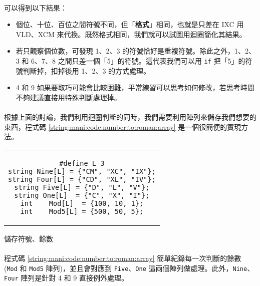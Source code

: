 \documentclass[12pt,a4paper,oneside]{report}
\begin{document}
\begin{CJK}{UTF8}{bkai}
\paragraph{}可以得到以下結果：
\begin{itemize}
\item 個位、十位、百位之間符號不同，但「{\color{blue}\textbf{格式}}」相同，也就是只差在 IXC 用 VLD、XCM 來代換。既然格式相同，我們就可以試圖用迴圈簡化其結果。
\item 若只觀察個位數，可發現 1、2、3 的符號恰好是重複符號。除此之外，1、2、3 和 6、7、8 之間只差一個「5」的符號。這代表我們可以用 \lstinline!if! 把「5」的符號判斷掉，扣掉後用 1、2、3 的方式處理。
\item 4 和 9 如果要取巧可能會比較困難，平常練習可以思考如何修改，若思考時間不夠建議直接用特殊判斷處理掉。
\end{itemize}

\paragraph{}根據上面的討論，我們利用迴圈判斷的同時，我們需要利用陣列來儲存我們想要的東西，程式碼 \ref{string:mani:code:number:to:roman:array} 是一個很簡便的實現方法。

\begin{code}[h!]
  \centering
  \begin{tabular}{c}
  \begin{lstlisting}
#define L 3
string Nine[L] = {"CM", "XC", "IX"};
string Four[L] = {"CD", "XL", "IV"};
string Five[L] = {"D", "L", "V"};
string One[L]  = {"C", "X", "I"};
int    Mod[L]  = {100, 10, 1};
int    Mod5[L] = {500, 50, 5};
  \end{lstlisting}
  \end{tabular}
  \caption{儲存符號、餘數}
  \label{string:mani:code:number:to:roman:array}
\end{code}

\paragraph{}程式碼 \ref{string:mani:code:number:to:roman:array} 簡單紀錄每一次判斷的餘數 (\lstinline!Mod! 和 \lstinline!Mod5! 陣列)，並且會對應到 \lstinline!Five!、\lstinline!One! 這兩個陣列做處理。此外，\lstinline!Nine!、\lstinline!Four! 陣列是針對 4 和 9 直接例外處理。


\end{CJK}
\end{document}
